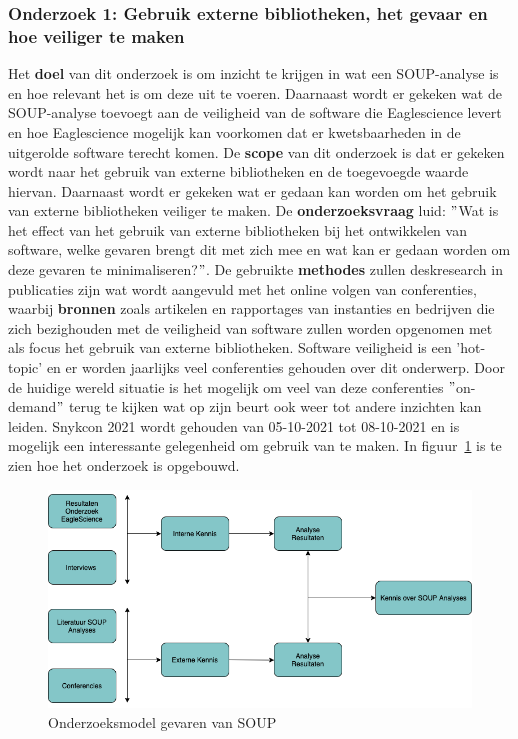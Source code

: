 \subsubsection{Onderzoek 1: Gebruik externe bibliotheken, het gevaar en hoe veiliger te maken}
Het \textbf{doel} van dit onderzoek is om inzicht te krijgen in wat een SOUP-analyse is en hoe relevant het is om deze uit te voeren. Daarnaast wordt er gekeken wat de SOUP-analyse toevoegt aan de veiligheid van de software die Eaglescience levert en hoe Eaglescience mogelijk kan voorkomen dat er kwetsbaarheden in de uitgerolde software terecht komen.
De \textbf{scope} van dit onderzoek is dat er gekeken wordt naar het gebruik van externe bibliotheken en de toegevoegde waarde hiervan. Daarnaast wordt er gekeken wat er gedaan kan worden om het gebruik van externe bibliotheken veiliger te maken.
De \textbf{onderzoeksvraag} luid: $"$Wat is het effect van het gebruik van externe bibliotheken bij het ontwikkelen van software, welke gevaren brengt dit met zich mee en wat kan er gedaan worden om deze gevaren te minimaliseren?$"$.
De gebruikte \textbf{methodes} zullen deskresearch in publicaties zijn wat wordt aangevuld met het online volgen van conferenties, waarbij \textbf{bronnen} zoals artikelen en rapportages van instanties en bedrijven die zich bezighouden met de veiligheid van software zullen worden opgenomen met als focus het gebruik van externe bibliotheken. Software veiligheid is een 'hot-topic' en er worden jaarlijks veel conferenties gehouden over dit onderwerp. Door de huidige wereld situatie is het mogelijk om veel van deze conferenties $"$on-demand$"$ terug te kijken wat op zijn beurt ook weer tot andere inzichten kan leiden. Snykcon 2021 wordt gehouden van 05-10-2021 tot 08-10-2021 en is mogelijk een interessante gelegenheid om gebruik van te maken. In figuur~\ref{fig:OnderzoeksModelNoodZaakSOUP} is te zien hoe het onderzoek is opgebouwd.
\begin{figure}[htbp]
    \myfloatalign
    \includegraphics[width=12cm]{gfx/OnderzoeksmodelSOUP}
    \caption{Onderzoeksmodel gevaren van SOUP}
    \label{fig:OnderzoeksModelNoodZaakSOUP}
\end{figure}


